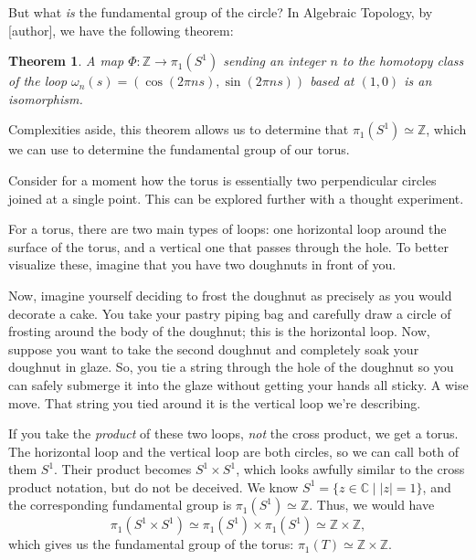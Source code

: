 \documentclass[12pt,a4paper,reqno,parskip=full]{amsart}
\numberwithin{equation}{section}
\theoremstyle{plain}
\newtheorem{theorem}[subsection]{Theorem}
\theoremstyle{definition}
\def\Z{{\mathbb Z}}
\def\C{{\mathbb C}}
\begin{document}
But what \textit{is} the fundamental group of the circle? In Algebraic Topology, by [author], we have the following theorem: %
\begin{theorem}
A map $\Phi:\Z\to\pi_1(S^1)$ sending an integer $n$ to the homotopy class of the loop $\omega_n(s)=(\cos(2\pi ns),\sin(2\pi ns))$ based at $(1,0)$ is an isomorphism.
\end{theorem}

Complexities aside, this theorem allows us to determine that $\pi_1(S^1)\simeq\Z$, which we can use to determine the fundamental group of our torus.

Consider for a moment how the torus is essentially two perpendicular circles joined at a single point. This can be explored further with a thought experiment.

For a torus, there are two main types of loops: one horizontal loop around the surface of the torus, and a vertical one that passes through the hole. To better visualize these, imagine that you have two doughnuts in front of you.

Now, imagine yourself deciding to frost the doughnut as precisely as you would decorate a cake. You take your pastry piping bag and carefully draw a circle of frosting around the body of the doughnut; this is the horizontal loop. Now, suppose you want to take the second doughnut and completely soak your doughnut in glaze. So, you tie a string through the hole of the doughnut so you can safely submerge it into the glaze without getting your hands all sticky. A wise move. That string you tied around it is the vertical loop we're describing.



If you take the \textit{product} of these two loops, \textit{not} the cross product, we get a torus. The horizontal loop and the vertical loop are both circles, so we can call both of them $S^1$. Their product becomes $S^1\times S^1$, which looks awfully similar to the cross product notation, but do not be deceived. We know $S^1=\{z\in\C\mid|z|=1\}$, and the corresponding fundamental group is $\pi_1(S^1)\simeq\Z$. Thus, we would have
\[\pi_1(S^1\times S^1)\simeq\pi_1(S^1)\times\pi_1(S^1)\simeq\Z\times\Z,\]
which gives us the fundamental group of the torus: $\pi_1(T)\simeq\Z\times\Z.$
\end{document}
